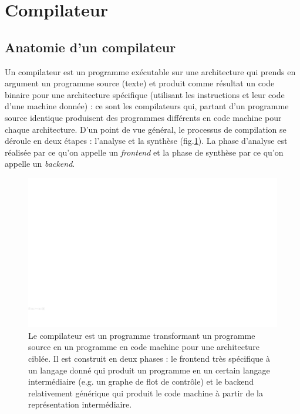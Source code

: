 

\section{Compilateur}

\subsection{Anatomie d'un compilateur}

Un compilateur est un programme exécutable sur une architecture qui prends en argument un programme source (texte) et produit comme résultat un code binaire pour une architecture spécifique (utilisant les instructions et leur code d'une machine donnée) : ce sont les compilateurs qui, partant d'un programme source identique produisent des programmes différents en code machine pour chaque architecture. D'un point de vue général, le processus de compilation se déroule en deux étapes : l'analyse et la synthèse (fig.\ref{fig:compilation_frontend_backend}). La phase d'analyse est réalisée par ce qu'on appelle un \emph{frontend} et la phase de synthèse par ce qu'on appelle un \emph{backend}.

\begin{figure}[htbp]
\includegraphics[width=\linewidth]{Figs/compilation_frontend_backend.pdf}
\caption{\label{fig:compilation_frontend_backend} Le compilateur est un programme transformant un programme source en un programme en code machine pour une architecture ciblée. Il est construit en deux phases : le frontend très spécifique à un langage donné qui produit un programme en un certain langage intermédiaire (e.g. un graphe de flot de contrôle) et le backend relativement générique qui produit le code machine à partir de la représentation intermédiaire.}
\end{figure}

